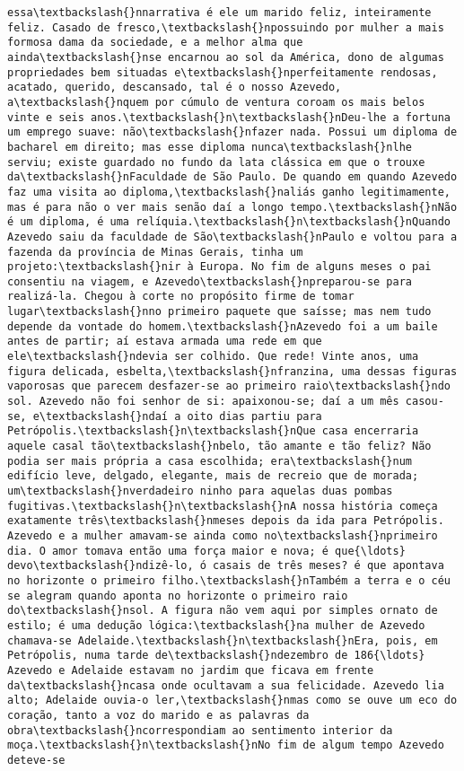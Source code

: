 \begin{Verbatim}[commandchars=\\\{\}]
essa\textbackslash{}nnarrativa é ele um marido feliz, inteiramente feliz. Casado de fresco,\textbackslash{}npossuindo por mulher a mais formosa dama da sociedade, e a melhor alma que ainda\textbackslash{}nse encarnou ao sol da América, dono de algumas propriedades bem situadas e\textbackslash{}nperfeitamente rendosas, acatado, querido, descansado, tal é o nosso Azevedo, a\textbackslash{}nquem por cúmulo de ventura coroam os mais belos vinte e seis anos.\textbackslash{}n\textbackslash{}nDeu-lhe a fortuna um emprego suave: não\textbackslash{}nfazer nada. Possui um diploma de bacharel em direito; mas esse diploma nunca\textbackslash{}nlhe serviu; existe guardado no fundo da lata clássica em que o trouxe da\textbackslash{}nFaculdade de São Paulo. De quando em quando Azevedo faz uma visita ao diploma,\textbackslash{}naliás ganho legitimamente, mas é para não o ver mais senão daí a longo tempo.\textbackslash{}nNão é um diploma, é uma relíquia.\textbackslash{}n\textbackslash{}nQuando Azevedo saiu da faculdade de São\textbackslash{}nPaulo e voltou para a fazenda da província de Minas Gerais, tinha um projeto:\textbackslash{}nir à Europa. No fim de alguns meses o pai consentiu na viagem, e Azevedo\textbackslash{}npreparou-se para realizá-la. Chegou à corte no propósito firme de tomar lugar\textbackslash{}nno primeiro paquete que saísse; mas nem tudo depende da vontade do homem.\textbackslash{}nAzevedo foi a um baile antes de partir; aí estava armada uma rede em que ele\textbackslash{}ndevia ser colhido. Que rede! Vinte anos, uma figura delicada, esbelta,\textbackslash{}nfranzina, uma dessas figuras vaporosas que parecem desfazer-se ao primeiro raio\textbackslash{}ndo sol. Azevedo não foi senhor de si: apaixonou-se; daí a um mês casou-se, e\textbackslash{}ndaí a oito dias partiu para Petrópolis.\textbackslash{}n\textbackslash{}nQue casa encerraria aquele casal tão\textbackslash{}nbelo, tão amante e tão feliz? Não podia ser mais própria a casa escolhida; era\textbackslash{}num edifício leve, delgado, elegante, mais de recreio que de morada; um\textbackslash{}nverdadeiro ninho para aquelas duas pombas fugitivas.\textbackslash{}n\textbackslash{}nA nossa história começa exatamente três\textbackslash{}nmeses depois da ida para Petrópolis. Azevedo e a mulher amavam-se ainda como no\textbackslash{}nprimeiro dia. O amor tomava então uma força maior e nova; é que{\ldots} devo\textbackslash{}ndizê-lo, ó casais de três meses? é que apontava no horizonte o primeiro filho.\textbackslash{}nTambém a terra e o céu se alegram quando aponta no horizonte o primeiro raio do\textbackslash{}nsol. A figura não vem aqui por simples ornato de estilo; é uma dedução lógica:\textbackslash{}na mulher de Azevedo chamava-se Adelaide.\textbackslash{}n\textbackslash{}nEra, pois, em Petrópolis, numa tarde de\textbackslash{}ndezembro de 186{\ldots} Azevedo e Adelaide estavam no jardim que ficava em frente da\textbackslash{}ncasa onde ocultavam a sua felicidade. Azevedo lia alto; Adelaide ouvia-o ler,\textbackslash{}nmas como se ouve um eco do coração, tanto a voz do marido e as palavras da obra\textbackslash{}ncorrespondiam ao sentimento interior da moça.\textbackslash{}n\textbackslash{}nNo fim de algum tempo Azevedo deteve-se 
\end{Verbatim}
